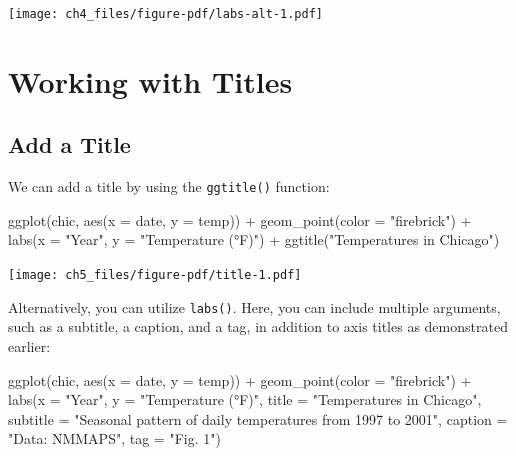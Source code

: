 \documentclass[
  letterpaper,
  DIV=11,
  numbers=noendperiod]{scrreprt}
\newenvironment{Shaded}{\begin{snugshade}}{\end{snugshade}}
\newcommand{\AttributeTok}[1]{\textcolor[rgb]{0.40,0.45,0.13}{#1}}
\newcommand{\FunctionTok}[1]{\textcolor[rgb]{0.28,0.35,0.67}{#1}}
\newcommand{\NormalTok}[1]{\textcolor[rgb]{0.00,0.23,0.31}{#1}}
\newcommand{\SpecialCharTok}[1]{\textcolor[rgb]{0.37,0.37,0.37}{#1}}
\newcommand{\StringTok}[1]{\textcolor[rgb]{0.13,0.47,0.30}{#1}}
\begin{document}
\texttt{[image: ch4\_files/figure-pdf/labs-alt-1.pdf]}


\chapter{Working with Titles}\label{titles}

\section{Add a Title}\label{add-a-title}

We can add a title by using the \texttt{ggtitle()} function:

\begin{Shaded}
\begin{Highlighting}[]
\FunctionTok{ggplot}\NormalTok{(chic, }\FunctionTok{aes}\NormalTok{(}\AttributeTok{x =}\NormalTok{ date, }\AttributeTok{y =}\NormalTok{ temp)) }\SpecialCharTok{+}
  \FunctionTok{geom\_point}\NormalTok{(}\AttributeTok{color =} \StringTok{"firebrick"}\NormalTok{) }\SpecialCharTok{+}
  \FunctionTok{labs}\NormalTok{(}\AttributeTok{x =} \StringTok{"Year"}\NormalTok{, }\AttributeTok{y =} \StringTok{"Temperature (°F)"}\NormalTok{) }\SpecialCharTok{+}
  \FunctionTok{ggtitle}\NormalTok{(}\StringTok{"Temperatures in Chicago"}\NormalTok{)}
\end{Highlighting}
\end{Shaded}

\texttt{[image: ch5\_files/figure-pdf/title-1.pdf]}

Alternatively, you can utilize \texttt{labs()}. Here, you can include
multiple arguments, such as a subtitle, a caption, and a tag, in
addition to axis titles as demonstrated earlier:

\begin{Shaded}
\begin{Highlighting}[]
\FunctionTok{ggplot}\NormalTok{(chic, }\FunctionTok{aes}\NormalTok{(}\AttributeTok{x =}\NormalTok{ date, }\AttributeTok{y =}\NormalTok{ temp)) }\SpecialCharTok{+}
  \FunctionTok{geom\_point}\NormalTok{(}\AttributeTok{color =} \StringTok{"firebrick"}\NormalTok{) }\SpecialCharTok{+}
  \FunctionTok{labs}\NormalTok{(}\AttributeTok{x =} \StringTok{"Year"}\NormalTok{, }\AttributeTok{y =} \StringTok{"Temperature (°F)"}\NormalTok{,}
       \AttributeTok{title =} \StringTok{"Temperatures in Chicago"}\NormalTok{,}
       \AttributeTok{subtitle =} \StringTok{"Seasonal pattern of daily temperatures from 1997 to 2001"}\NormalTok{,}
       \AttributeTok{caption =} \StringTok{"Data: NMMAPS"}\NormalTok{,}
       \AttributeTok{tag =} \StringTok{"Fig. 1"}\NormalTok{)}
\end{Highlighting}
\end{Shaded}
\end{document}

